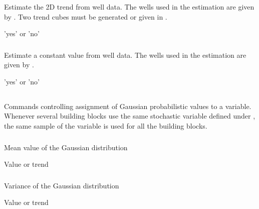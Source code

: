 {\subsubsection{}
 \slist
   \item \Description Estimate the 2D trend from well data. The wells used in the estimation are given by . Two trend cubes must be generated or given in .
   \item \Argument 'yes' or 'no'
   \item \Default 
 \elist

\subsubsection{}
 \slist
   \item \Description Estimate a constant value from well data. The wells used in the estimation are given by .
   \item \Argument 'yes' or 'no'
   \item \Default 
 \elist

\subsection{}
 \slist
   \item \Description Commands controlling assignment of Gaussian probabilistic values to a variable. Whenever several building blocks use the same stochastic variable defined under , the same sample of the variable is used for all the building blocks. 
   \item \Argument
   \item \Default 
 \elist

\subsubsection{}
 \slist
   \item \Description Mean value of the Gaussian distribution
   \item \Argument Value or trend
   \item \Default 
 \elist

\subsubsection{}
 \slist
   \item \Description Variance of the Gaussian distribution
   \item \Argument Value or trend
   \item \Default 
 \elist

}
